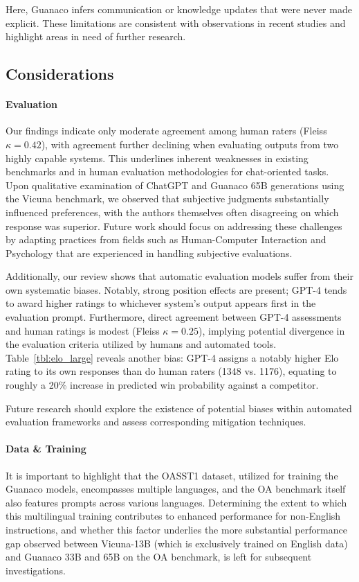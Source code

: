 Here, {Guanaco} infers communication or knowledge updates that were never made explicit. These limitations are consistent with observations in recent studies \cite{sap2022neural} and highlight areas in need of further research.

\subsection{Considerations}
\label{ssec:considerations}

\paragraph{Evaluation}

Our findings indicate only moderate agreement among human raters (Fleiss $\kappa=0.42$), with agreement further declining when evaluating outputs from two highly capable systems. This underlines inherent weaknesses in existing benchmarks and in human evaluation methodologies for chat-oriented tasks. Upon qualitative examination of ChatGPT and {Guanaco} 65B generations using the Vicuna benchmark, we observed that subjective judgments substantially influenced preferences, with the authors themselves often disagreeing on which response was superior. Future work should focus on addressing these challenges by adapting practices from fields such as Human-Computer Interaction and Psychology that are experienced in handling subjective evaluations.

Additionally, our review shows that automatic evaluation models suffer from their own systematic biases. Notably, strong position effects are present; GPT-4 tends to award higher ratings to whichever system's output appears first in the evaluation prompt. Furthermore, direct agreement between GPT-4 assessments and human ratings is modest (Fleiss $\kappa=0.25$), implying potential divergence in the evaluation criteria utilized by humans and automated tools. Table~\ref{tbl:elo_large} reveals another bias: GPT-4 assigns a notably higher Elo rating to its own responses than do human raters (1348 vs. 1176), equating to roughly a 20\% increase in predicted win probability against a competitor.

Future research should explore the existence of potential biases within automated evaluation frameworks and assess corresponding mitigation techniques.

\paragraph{Data \& Training} It is important to highlight that the OASST1 dataset, utilized for training the {Guanaco} models, encompasses multiple languages, and the OA benchmark itself also features prompts across various languages. Determining the extent to which this multilingual training contributes to enhanced performance for non-English instructions, and whether this factor underlies the more substantial performance gap observed between Vicuna-13B (which is exclusively trained on English data) and {Guanaco} 33B and 65B on the OA benchmark, is left for subsequent investigations.

